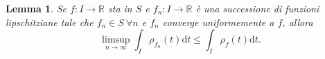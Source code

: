 \documentclass[a4paper,11pt]{book}
\theoremstyle{plain}
\newtheorem{lemma}[teo]{Lemma}
\theoremstyle{definition}
\newtheorem{defn}{Definizione}[chapter]
\theoremstyle{remark}
\newcommand{\R}{\mathbb{R}}
\newcommand{\LL}{\mathscr{L}}
\newcommand{\diff}{\text{d}}
\begin{document}
\begin{lemma}
	Se $f:I\to\R$ sta in $S$ e $f_n:I\to\R$ è una successione di funzioni lipschitziane tale che $f_n\in S\ \forall n$ e $f_n$ converge uniformemente a $f$, allora
	\[
		\limsup_{n\to\infty}\int_I\rho_{f_n}(t)\diff t\leq \int_I \rho_{f}(t)\diff t.
	\]
\end{lemma}
\begin{comment}
Prima di procedere nella dimostrazione ricordiamo alcuni risultati di teoria della misura:
\begin{defn}
	Un punto $x\in E$ di un insieme misurabile si dice \textit{punto di densità} se
	\[
		\lim_{r\to0} \frac{\LL(I_r\cap E)}{\LL(I_r)} = 1\qquad \text{con }I_r = (x-r,x+r).
	\]
\end{defn}
Useremo il fatto noto che quasi ogni $x\in E$ è un punto di densità.\\
Sia $\mathscr{F}$ una famiglia di intervalli chiusi con la proprietà che per ogni $\epsilon > 0$ e $x\in E$ esiste $I\in\mathscr{F}$ tale che $x\in I$ e $\LL(I)<\epsilon$. Una famiglia $\mathscr{F}$ con tali proprietà verrà chiamata ricoprimento di $E$ \textit{nel senso di Vitali}. Per tali ricoprimenti esiste un sottoricoprimento numerabile $\{I_m\}\subset\mathscr{F}$ tale che $\LL\left(E\setminus\left(\bigcup_m I_m\right)\right) = 0$ e gli $I_m$ sono disgiunti a due a due.
\end{comment}
\end{document}
